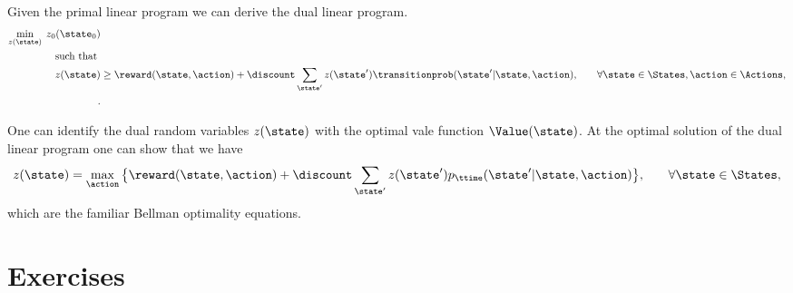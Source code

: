 \begin{leftbar}
Given the primal linear program we can derive the dual linear
program.
\begin{align*}
\min_{z(\state)}  \;z_0(\state_0)&\\
\mbox{ such that }\\
%
 z(\state) &\geq
\reward(\state,\action) + \discount
\sum_{\state'}z(\state')\transitionprob(\state'|\state,\action) , &\quad\forall
\state \in {\States},\action\in\Actions, \\ .
\end{align*}

One can identify the dual random variables $z(\state)$ with the
optimal vale function $\Value(\state)$. At the optimal solution of
the dual linear program one can show that we have
\begin{align*}
 z(\state) &= \max_\action \big\{
\reward(\state,\action) + \discount
\sum_{\state'}z(\state')p_{\ttime}(\state'|\state,\action) \big\} ,
&\quad\forall \state \in {\States},
\end{align*}
which are the familiar Bellman optimality equations.

%
%
%
%

\end{leftbar}

\section*{Exercises}


